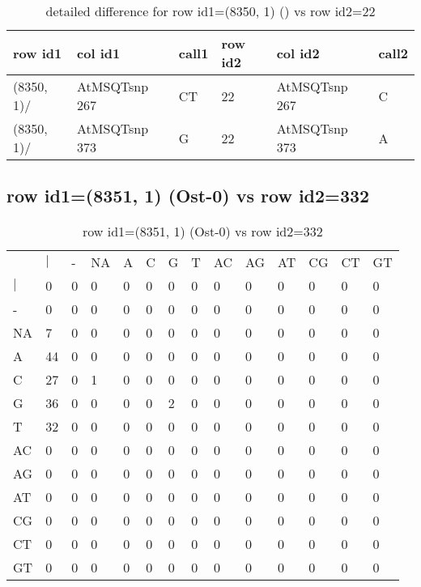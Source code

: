\begin{center}
\begin{longtable}{|l|l|l|l|l|l|}
\caption{detailed difference for row id1=(8350, 1) () vs row id2=22} \label{table_dm561}\\
\hline
row id1&col id1&call1&row id2&col id2&call2\\
\hline
(8350, 1)/&AtMSQTsnp 267&CT&22&AtMSQTsnp 267&C\\
(8350, 1)/&AtMSQTsnp 373&G&22&AtMSQTsnp 373&A\\
\hline
\end{longtable}
\end{center}

\subsection{row id1=(8351, 1) (Ost-0) vs row id2=332}
\begin{center}
\begin{longtable}{|l|l|l|l|l|l|l|l|l|l|l|l|l|l|}
\caption{row id1=(8351, 1) (Ost-0) vs row id2=332} \label{table_dm562}\\
\hline
\\
\hline
&$|$&-&NA&A&C&G&T&AC&AG&AT&CG&CT&GT\\
$|$&0&0&0&0&0&0&0&0&0&0&0&0&0\\
-&0&0&0&0&0&0&0&0&0&0&0&0&0\\
NA&7&0&0&0&0&0&0&0&0&0&0&0&0\\
A&44&0&0&0&0&0&0&0&0&0&0&0&0\\
C&27&0&1&0&0&0&0&0&0&0&0&0&0\\
G&36&0&0&0&0&2&0&0&0&0&0&0&0\\
T&32&0&0&0&0&0&0&0&0&0&0&0&0\\
AC&0&0&0&0&0&0&0&0&0&0&0&0&0\\
AG&0&0&0&0&0&0&0&0&0&0&0&0&0\\
AT&0&0&0&0&0&0&0&0&0&0&0&0&0\\
CG&0&0&0&0&0&0&0&0&0&0&0&0&0\\
CT&0&0&0&0&0&0&0&0&0&0&0&0&0\\
GT&0&0&0&0&0&0&0&0&0&0&0&0&0\\
\hline
\end{longtable}
\end{center}

